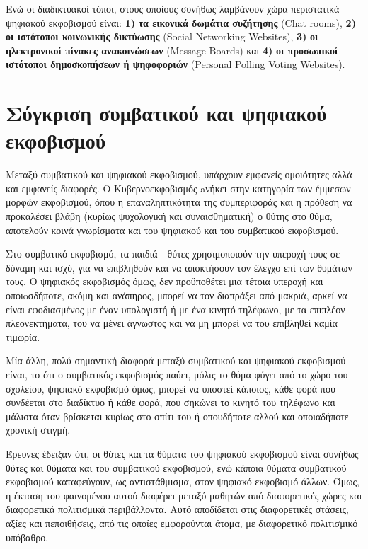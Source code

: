 \documentclass[12pt,a4paper,oneside]{book}
\begin{document}
\indent Ενώ οι διαδικτυακοί τόποι, στους οποίους συνήθως λαμβάνουν χώρα
περιστατικά ψηφιακού εκφοβισμού είναι: \textbf{1)} \textbf{τα εικονικά δωμάτια
συζήτησης} (Chat rooms), \textbf{2)} \textbf{οι ιστότοποι κοινωνικής δικτύωσης}
(Social Networking Websites),  \textbf{3)} \textbf{οι ηλεκτρονικοί πίνακες
ανακοινώσεων} (Message Boards) και \textbf{4)} \textbf{οι προσωπικοί ιστότοποι δημοσκοπήσεων ή ψηφοφοριών} (Personal Polling
Voting Websites).

\section*{Σύγκριση συμβατικού και ψηφιακού εκφοβισμού}
\indent Μεταξύ συμβατικού και ψηφιακού εκφοβισμού, υπάρχουν εμφανείς ομοιότητες
αλλά και εμφανείς διαφορές. Ο Κυβερνοεκφοβισμός aνήκει στην κατηγορία των έμμεσων μορφών εκφοβισμού, όπου η επαναληπτικότητα
της συμπεριφοράς και η πρόθεση να προκαλέσει βλάβη (κυρίως ψυχολογική και
συναισθηματική) ο θύτης στο θύμα, αποτελούν κοινά γνωρίσματα και του ψηφιακού
και του συμβατικού εκφοβισμού.

\indent Στο συμβατικό εκφοβισμό, τα παιδιά - θύτες χρησιμοποιούν την υπεροχή
τους σε δύναμη και ισχύ, για να επιβληθούν και να αποκτήσουν τον έλεγχο επί των θυμάτων τους. Ο ψηφιακός εκφοβισμός όμως, δεν προϋποθέτει μια τέτοια υπεροχή και οποιoσδήποτε, ακόμη και ανάπηρος, μπορεί να
τον διαπράξει από μακριά, αρκεί να είναι εφοδιασμένος με έναν υπολογιστή ή με
ένα κινητό τηλέφωνο, με τα επιπλέον πλεονεκτήματα, του να μένει άγνωστος και να
μη μπορεί να του επιβληθεί καμία τιμωρία.

\indent Μία άλλη, πολύ σημαντική διαφορά μεταξύ συμβατικού και ψηφιακού
εκφοβισμού είναι, το ότι ο συμβατικός εκφοβισμός παύει, μόλις το θύμα φύγει από το χώρο του σχολείου, ψηφιακό εκφοβισμό όμως,
μπορεί να υποστεί κάποιος, κάθε φορά που συνδέεται στο διαδίκτυο ή κάθε φορά,
που σηκώνει το κινητό του τηλέφωνο και μάλιστα όταν βρίσκεται κυρίως στο σπίτι
του ή οπουδήποτε αλλού και οποιαδήποτε χρονική στιγμή.

\indent Έρευνες έδειξαν ότι, οι θύτες και τα θύματα του ψηφιακού εκφοβισμού
είναι συνήθως θύτες και θύματα και του συμβατικού εκφοβισμού, ενώ κάποια θύματα συμβατικού εκφοβισμού καταφεύγουν, ως
αντιστάθμισμα, στον ψηφιακό εκφοβισμό άλλων. Όμως, η έκταση του φαινομένου αυτού
διαφέρει μεταξύ μαθητών από διαφορετικές χώρες και διαφορετικά πολιτισμικά
περιβάλλοντα. Αυτό αποδίδεται στις διαφορετικές στάσεις, αξίες και πεποιθήσεις,
από τις οποίες εμφορούνται άτομα,  με διαφορετικό πολιτισμικό υπόβαθρο.
\end{document}
